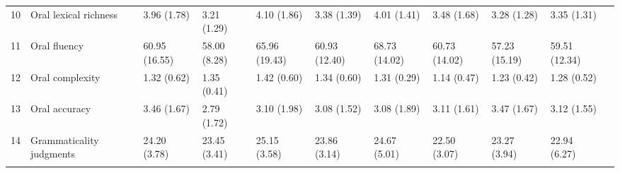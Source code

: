 \documentclass[output=paper,modfonts,nonflat,newtxmath]{langsci/langscibook}
\begin{document}
\begin{table}
{\begin{tabularx}{\textwidth}{l p{4cm} YYYYYYYYY}
 10 & Oral lexical richness & { 3.96} (1.78) & { 3.21} (1.29) & { 4.10} (1.86) & { 3.38} (1.39) & { 4.01} (1.41) & { 3.48} (1.68) & { 3.28} (1.28) & { 3.35} (1.31)\\
 11 & Oral fluency & { 60.95} (16.55) & { 58.00} (8.28) & { 65.96} (19.43) & { 60.93} (12.40) & { 68.73} (14.02) & { 60.73} (14.02) & { 57.23} (15.19) & { 59.51} (12.34)\\
 12 & Oral complexity & { 1.32} (0.62) & { 1.35} (0.41) & { 1.42} (0.60) & { 1.34} (0.60) & { 1.31} (0.29) & { 1.14} (0.47) & { 1.23} (0.42) & { 1.28} (0.52)\\
 13 & Oral accuracy & { 3.46} (1.67) & { 2.79} (1.72) & { 3.10} (1.98) & { 3.08} (1.52) & { 3.08} (1.89) & { 3.11} (1.61) & { 3.47} (1.67) & { 3.12} (1.55)\\
 14 & Grammaticality \newline judgments & { 24.20} (3.78) & { 23.45} (3.41) & { 25.15} (3.58) & { 23.86} (3.14) & { 24.67} (5.01) & { 22.50} (3.07) & { 23.27} (3.94) & { 22.94} (6.27)\\
\lspbottomrule
\end{tabularx}
}
\end{table}
\end{document}
